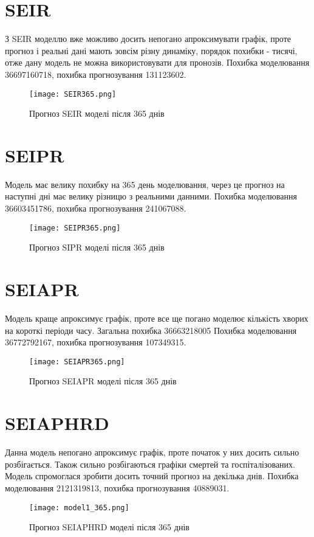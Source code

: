 \section{SEIR}


З SEIR моделлю вже можливо досить непогано апроксимувати графік, проте 
прогноз і реальні дані мають зовсім різну динаміку, порядок похибки - 
тисячі, отже дану модель не можна використовувати для пронозів. 
Похибка моделювання 36697160718, похибка прогнозування 131123602.


\begin{figure}[H]
    \centering
    \texttt{[image: SEIR365.png]}
    \caption{Прогноз SEIR моделі після 365 днів}
    \label{fig:plot2}
\end{figure}
\section{SEIPR}

Модель має велику похибку на 365 день моделювання, через це прогноз 
на наступні дні має велику різницю з реальними данними. 
Похибка моделювання 36603451786, похибка прогнозування 241067088.

\begin{figure}[H]
    \centering
    \texttt{[image: SEIPR365.png]}
    \caption{Прогноз SIPR моделі після 365 днів}
    \label{fig:plot3}
\end{figure}
\section{SEIAPR}

Модель краще апроксимує графік, проте все ще погано моделює 
кількість хворих на короткі періоди часу. 
Загальна похибка 36663218005
Похибка моделювання 36772792167, похибка прогнозування 107349315.
\begin{figure}[H]
    \centering
    \texttt{[image: SEIAPR365.png]}
    \caption{Прогноз SEIAPR моделі після 365 днів}
    \label{fig:plot4}
\end{figure}
\section{SEIAPHRD}


Данна модель непогано апроксимує графік, проте початок у них досить сильно 
розбігається. Також сильно розбігаються графіки смертей та госпіталізованих.
Модель спромоглася зробити досить точний прогноз на декілька 
днів.
Похибка моделювання 2121319813, похибка прогнозування 40889031.
\begin{figure}[H]
    \centering
    \texttt{[image: model1\_365.png]}
    \caption{Прогноз SEIAPHRD моделі після 365 днів}
    \label{fig:plot5}
\end{figure}


